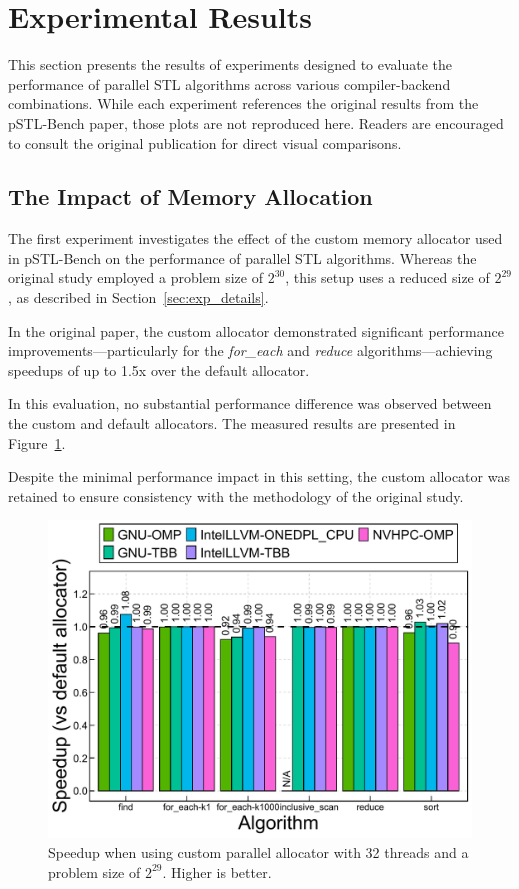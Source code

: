 \documentclass[sigconf]{acmart}
\begin{document}
\section{Experimental Results}

This section presents the results of experiments designed to evaluate the
performance of parallel STL algorithms across various compiler-backend
combinations. While each experiment references the original results from the
pSTL-Bench paper, those plots are not reproduced here. Readers are encouraged
to consult the original publication for direct visual comparisons.

\subsection{The Impact of Memory Allocation}

The first experiment investigates the effect of the custom memory allocator
used in pSTL-Bench on the performance of parallel STL algorithms. Whereas the
original study employed a problem size of $2^{30}$, this setup uses a reduced
size of $2^{29}$, as described in Section~\ref{sec:exp_details}.

In the original paper, the custom allocator demonstrated significant
performance improvements—particularly for the \textit{for\_each} and
\textit{reduce} algorithms—achieving speedups of up to 1.5x over the default
allocator.

In this evaluation, no substantial performance difference was observed between
the custom and default allocators. The measured results are presented in
Figure~\ref{fig:speedup_customAllocator}.

Despite the minimal performance impact in this setting, the custom allocator
was retained to ensure consistency with the methodology of the original study.

\begin{figure}[H]
      \centering
      \includegraphics[width=\linewidth]{figures/speedup_customAllocator}
      \caption{Speedup when using custom parallel allocator with 32 threads and a problem size of $2^{29}$. Higher is better.}\label{fig:speedup_customAllocator}
\end{figure}
\end{document}
